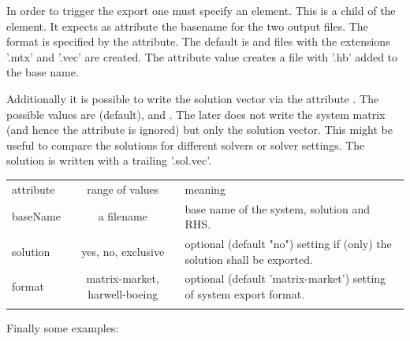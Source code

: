 In order to trigger the export one must specify an  element.
This is a child of the  element. It expects as 
attribute the basename for the two output files. The format is specified by
the  attribute. The default is  and files
with the extensions '.mtx' and '.vec' are created. The attribute value
 creates a file with '.hb' added to the base name.

Additionally it is possible to write the solution vector via the attribute
. The possible values are  (default),  and
. The later does not write the system matrix (and hence the
 attribute is ignored) but only the solution vector. This might be
useful to compare the solutions for different solvers or solver settings. The
solution is written with a trailing '.sol.vec'. 
\begin{center}
\begin{tabular}{lcp{}}
\hline\noalign{\smallskip}
attribute & range of values & meaning \\
\noalign{\smallskip}\hline\noalign{\smallskip}
baseName & a filename & base name of the system, solution and RHS. \\
solution & yes, no, exclusive & optional (default "no") setting if (only) the solution shall be exported.\\
format & matrix-market, harwell-boeing & optional (default 'matrix-market') setting of system export format. \\
\noalign{\smallskip}\hline
\end{tabular}
\end{center}
Finally some examples:%
